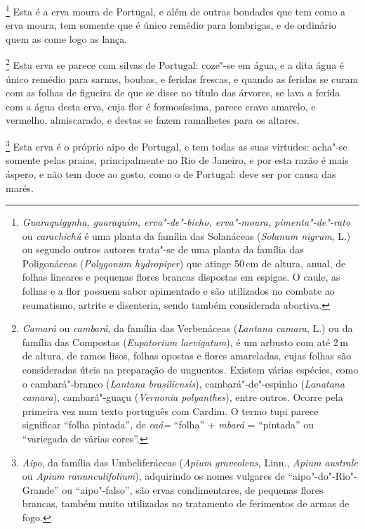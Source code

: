 \footnote{ \textit{Guaraquigynha, guaraquim,
erva"-de"-bicho, erva"-moura, pimenta"-de"-rato} ou \textit{carachichú} 
é uma planta da família das Solanáceas (\textit{Solanum nigrum}, L.) ou
segundo outros autores trata"-se de uma planta da família das
Poligonáceas (\textit{Polygonum hydropiper}) que atinge 50\,cm de
altura, anual, de folhas lineares e pequenas flores brancas dispostas
em espigas. O caule, as folhas e a flor possuem sabor apimentado e são
utilizados no combate ao reumatismo, artrite e disenteria, sendo também
considerada abortiva.} Esta é a erva moura de Portugal, e
além de outras bondades que tem como a erva moura, tem somente que é
único remédio para lombrigas, e de ordinário quem as come logo as lança. 

\footnote{ \textit{Camará} ou \textit{cambará}, da
família das Verbenáceas (\textit{Lantana camara}, L.) ou da família das
Compostas (\textit{Eupatorium laevigatum}), é um arbusto com até 2\,m de
altura, de ramos lisos, folhas opostas e flores amareladas, cujas
folhas são consideradas úteis na preparação de unguentos. Existem várias
espécies, como o cambará"-branco (\textit{Lantana brasiliensis}), 
cambará"-de"-espinho (\textit{Lanatana camara}), cambará"-guaçu
(\textit{Vernonia polyanthes}), entre outros. Ocorre pela primeira vez
num texto português com Cardim. O termo tupi parece significar ``folha
pintada'', de \textit{caá=} ``folha'' + \textit{mbará} = ``pintada'' ou 
``variegada de várias cores''.} Esta erva se parece com silvas
de Portugal: coze"-se em água, e a dita água é único remédio para
sarnas, boubas, e feridas frescas, e quando as feridas se curam com as
folhas de figueira de que se disse no título das árvores, se lava a
ferida com a água desta erva, cuja flor é formosíssima, parece cravo
amarelo, e vermelho, almiscarado, e destas se fazem ramalhetes para os altares.

\footnote{ \textit{Aipo}, da família das Umbeliferáceas
(\textit{Apium graveolens}, Linn., \textit{Apium australe} ou
\textit{Apium ranunculifolium}), adquirindo os nomes vulgares de
``aipo"-do"-Rio"-Grande'' ou ``aipo"-falso'', são ervas condimentares, de
pequenas flores brancas, também muito utilizadas no tratamento de
ferimentos de armas de fogo.} Esta erva é o próprio aipo
de Portugal, e tem todas as suas virtudes: acha"-se somente pelas
praias, principalmente no Rio de Janeiro, e por esta razão é mais
áspero, e não tem doce ao gosto, como o de Portugal: deve ser por causa
das marés. 

